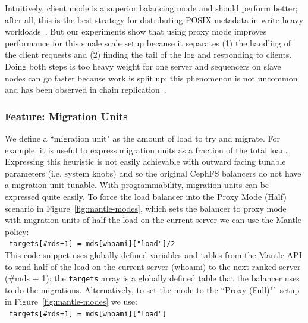 \documentclass[preprint]{sigplanconf-eurosys}
\begin{document}
Intuitively, client mode is a superior balancing mode and should perform
better; after all, this is the best strategy for distributing POSIX metadata in
write-heavy workloads~\cite{ren:sc2014-indexfs, patil:fast2011-giga,
sevilla:sc15-mantle}.  But our experiments show that using proxy mode improves
performance for this smale scale setup because it separates (1) the handling of
the client requests and (2) finding the tail of the log and responding to
clients.  Doing both steps is too heavy weight for one server and sequencers on
slave nodes can go faster because work is split up; this phenomenon is not
uncommon and has been observed in chain replication~\cite{CITEME}.

\subsubsection{Feature: Migration Units}
\label{sec:feature-migration-units}

We define a ``migration unit" as the amount of load to try and migrate.  For
example, it is useful to express migration units as a fraction of the total
load.  Expressing this heuristic is not easily achievable with outward facing
tunable parameters (i.e. system knobs) and so the original CephFS balancers do
not have a migration unit tunable.  With programmability, migration units can
be expressed quite easily. To force the load balancer into the Proxy Mode (Half)
scenario in Figure~\ref{fig:mantle-modes}, which sets the balancer to proxy
mode with migration units of half the load on the current server we can use the
Mantle policy:\\

\noindent \texttt{ targets[\#mds+1] = mds[whoami]["load"]/2 }\\

This code snippet uses globally defined variables and tables from the Mantle
API to send half of the load on the current server (whoami) to the next ranked
server (\#mds + 1); the \texttt{targets} array is a globally defined table that
the balancer uses to do the migrations. Alternatively, to set the mode to the
``Proxy (Full)"` setup in Figure~\ref{fig:mantle-modes} we use:\\

\noindent \texttt{ targets[\#mds+1] = mds[whoami]["load"] }\\
\end{document}
